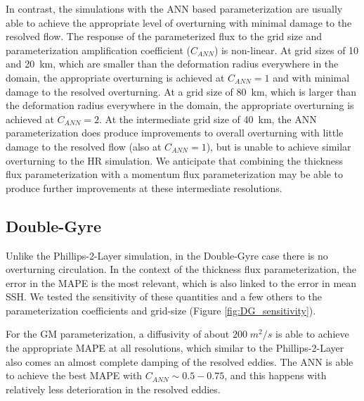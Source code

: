 \documentclass[draft,ms]{agutexSI2019}
\begin{document}
\begin{article}
In contrast, the simulations with the ANN based parameterization are usually able to achieve the appropriate level of overturning with minimal damage to the resolved flow. The response of the parameterized flux to the grid size and parameterization amplification coefficient ($C_{ANN}$) is non-linear. At grid sizes of 10 and 20~km, which are smaller than the deformation radius everywhere in the domain, the appropriate overturning is achieved at $C_{ANN}=1$ and with minimal damage to the resolved overturning. At a grid size of 80~km, which is larger than the deformation radius everywhere in the domain, the appropriate overturning is achieved at $C_{ANN}=2$. At the intermediate grid size of 40~km, the ANN parameterization does produce improvements to overall overturning with little damage to the resolved flow (also at $C_{ANN}=1$), but is unable to achieve similar overturning to the HR simulation. We anticipate that combining the thickness flux parameterization with a momentum flux parameterization may be able to produce further improvements at these intermediate resolutions. 



\subsection{Double-Gyre}
Unlike the Phillips-2-Layer simulation, in the Double-Gyre case there is no overturning circulation. In the context of the thickness flux parameterization, the error in the MAPE is the most relevant, which is also linked to the error in mean SSH. We tested the sensitivity of these quantities and a few others to the parameterization coefficients and grid-size (Figure \ref{fig:DG_sensitivity}). 

For the GM parameterization, a diffusivity of about $200\;m^2/s$ is able to achieve the appropriate MAPE at all resolutions, which similar to the Phillips-2-Layer also comes an almost complete damping of the resolved eddies. The ANN is able to achieve the best MAPE with $C_{ANN}\sim 0.5-0.75$, and this happens with relatively less deterioration in the resolved eddies.


\end{article}
\end{document}
